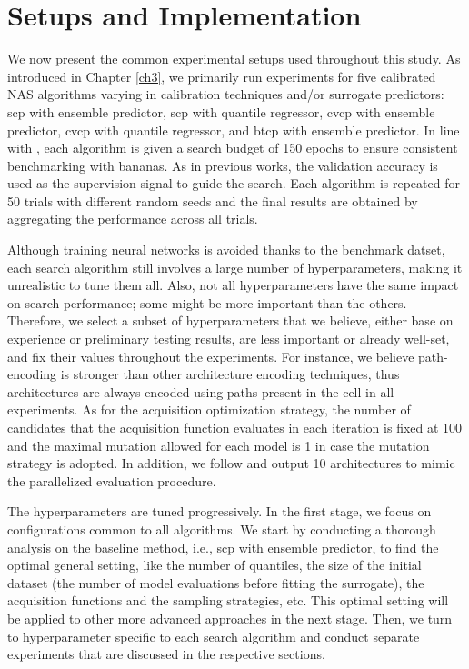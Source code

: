 \documentclass[a4paper,oneside,bibliography=totoc]{scrbook}
\begin{document}
\section{Setups and Implementation}
\label{sec: setups}
We now present the common experimental setups used throughout this study. As introduced in Chapter \ref{ch3}, we primarily run experiments for five calibrated NAS algorithms varying in calibration techniques and/or surrogate predictors: \gls{scp} with ensemble predictor, \gls{scp} with quantile regressor, \gls{cvcp} with ensemble predictor, \gls{cvcp} with quantile regressor, and \gls{btcp} with ensemble predictor. In line with \cite{white2019bananas}, each algorithm is given a search budget of 150 epochs to ensure consistent benchmarking with \gls{bananas}. As in previous works, the validation accuracy is used as the supervision signal to guide the search. Each algorithm is repeated for 50 trials with different random seeds and the final results are obtained by aggregating the performance across all trials. 

\vspace{0.2em}
Although training neural networks is avoided thanks to the benchmark datset, each search algorithm still involves a large number of hyperparameters, making it unrealistic to tune them all. Also, not all hyperparameters have the same impact on search performance; some might be more important than the others. Therefore, we select a subset of hyperparameters that we believe, either base on experience or preliminary testing results, are less important or already well-set, and fix their values throughout the experiments. For instance, we believe path-encoding is stronger than other architecture encoding techniques, thus architectures are always encoded using paths present in the cell in all experiments. As for the acquisition optimization strategy, the number of candidates that the acquisition function evaluates in each iteration is fixed at 100 and the maximal mutation allowed for each model is  1 in case the mutation strategy is adopted. In addition, we follow \cite{white2019bananas} and output 10 architectures to mimic the parallelized evaluation procedure.
\vspace{0.2em}

The hyperparameters are tuned progressively. In the first stage, we focus on configurations common to all algorithms. We start by conducting a thorough analysis on the baseline method, i.e., \gls{scp} with ensemble predictor, to find the optimal general setting, like the number of quantiles, the size of the initial dataset (the number of model evaluations before fitting the surrogate), the acquisition functions and the sampling strategies, etc. This optimal setting will be applied to other more advanced approaches in the next stage. Then, we turn to hyperparameter specific to each search algorithm and 
	conduct separate experiments that are  discussed in the respective sections.
\end{document}
